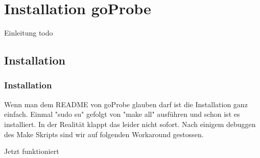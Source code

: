 \chapter{Installation goProbe}
Einleitung todo

\section{Installation}
\subsection{Installation}
Wenn man dem README von goProbe glauben darf ist die Installation ganz einfach. Einmal "sudo su" gefolgt von "make all" ausführen und schon ist es installiert. In der Realität klappt das leider nicht sofort.
Nach einigem debuggen des Make Skripts sind wir auf folgenden Workaround gestossen.






%


Jetzt funktioniert 
